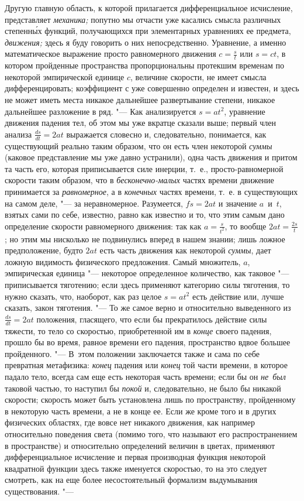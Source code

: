 Другую главную область, к которой прилагается дифференциальное исчисление,
представляет {\em механика;} попутно мы отчасти уже касались смысла различных
степенн\'{ы}х функций, получающихся при элементарных уравнениях ее предмета,
{\em движения;} здесь я буду говорить о них непосредственно. Уравнение, а
именно математическое выражение просто равномерного движения $c=\frac s t$ или
$s=ct$, в котором пройденные пространства пропорциональны протекшим временам по
некоторой эмпирической единице $c$, величине скорости, не имеет смысла
дифференцировать; коэффициент с уже совершенно определен и известен, и здесь не
может иметь места никакое дальнейшее развертывание степени, никакое дальнейшее
разложение в ряд. "--- Как анализируется $s=at^2$, уравнение движения падения
тел, об этом мы уже вкратце сказали выше; первый член анализа
$\frac{ds}{dt}=2at$ выражается словесно и, следовательно, понимается, как
существующий реально таким образом, что он есть член некоторой {\em суммы}
(каковое представление мы уже давно устранили), одна часть движения и притом та
часть его, которая приписывается силе инерции, т.~е., просто-равномерной
скорости таким образом, что в {\em бесконечно-малых} частях времени движение
принимается за {\em равномерное}, а в {\em конечных} частях времени, т.~е. в
существующих на самом деле, "--- за неравномерное. Разумеется, $fs=2at$ и
значение $a$~и~$t$, взятых сами по себе, известно, равно как известно и то, что
этим самым дано определение скорости равномерного движения: так как $a=\frac
s{t^2}$, то вообще $2at=\frac{2s} t$; но этим мы нисколько не подвинулись
вперед в нашем знании; лишь ложное предположение, будто $2at$ есть часть
движения как некоторой {\em суммы}, дает ложную видимость физического
предложения. Самый множитель, $a$, эмпирическая единица "--- некоторое
определенное количество, как таковое "--- приписывается тяготению; если здесь
применяют категорию силы тяготения, то нужно сказать, что, наоборот, как раз
целое $s=at^2$ есть действие или, лучше сказать, закон тяготения. "--- То же
самое верно и относительно выведенного из $\frac{ds}{dt}=2at$ положения,
гласящего, что если бы прекратилось действие силы тяжести, то тело со
скоростью, приобретенной им в {\em конце} своего падения, прошло бы во время,
равное времени его падения, пространство вдвое большее пройденного. "--- В~этом
положении заключается также и сама по себе превратная метафизика: {\em конец}
падения или {\em конец} той части времени, в которое падало тело, всегда сам
еще есть некоторая часть времени; если бы он {\em не~был} таковой частью, то
наступил бы {\em покой} и, следовательно, не было бы никакой скорости; скорость
может быть установлена лишь по пространству, пройденному в некоторую часть
времени, а не в конце ее. Если же кроме того и в других физических областях,
где вовсе нет никакого движения, как например относительно поведения света
(помимо того, что называют его распространением в пространстве) и относительно
определений величин в цветах, применяют дифференциальное исчисление и первая
производная функция некоторой квадратной функции здесь также именуется
скоростью, то на это следует смотреть, как на еще более несостоятельный
формализм выдумывания существования. "---

